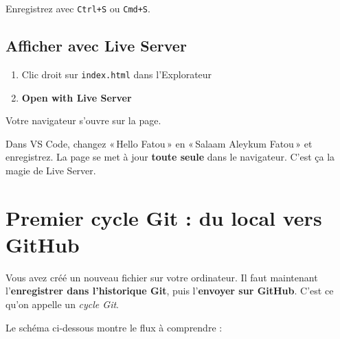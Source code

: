 \documentclass[11pt,a4paper]{article}
\newcommand{\cmark}{\ding{51}}
\begin{document}
Enregistrez avec \texttt{Ctrl+S} ou \texttt{Cmd+S}.

\subsection{Afficher avec Live Server}

\begin{enumerate}[nosep]
    \item Clic droit sur \texttt{index.html} dans l'Explorateur
    \item \textbf{Open with Live Server}
\end{enumerate}

Votre navigateur s'ouvre sur la page. \cmark

\begin{infobox}
Dans VS Code, changez «\,Hello Fatou\,» en «\,Salaam Aleykum Fatou\,» et
enregistrez. La page se met à jour \textbf{toute seule} dans le navigateur.
C'est ça la magie de Live Server.
\end{infobox}

\newpage

\section{Premier cycle Git : du local vers GitHub}

Vous avez créé un nouveau fichier sur votre ordinateur. Il faut maintenant
l'\textbf{enregistrer dans l'historique Git}, puis l'\textbf{envoyer sur
GitHub}. C'est ce qu'on appelle un \emph{cycle Git}.

Le schéma ci-dessous montre le flux à comprendre :
\end{document}
